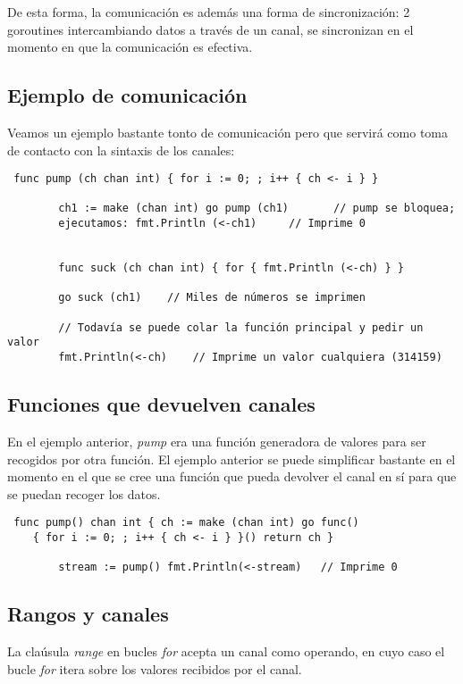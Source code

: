 	De esta forma, la comunicación es además una forma de sincronización:
	2 goroutines intercambiando datos a través de un canal, se sincronizan en el
	momento en que la comunicación es efectiva.
	
	\subsection{Ejemplo de comunicación}
	
	Veamos un ejemplo bastante tonto de comunicación pero que servirá como toma
	de contacto con la sintaxis de los canales:
	
	\begin{verbatim} func pump (ch chan int) { for i := 0; ; i++ { ch <- i } }
	   
		ch1 := make (chan int) go pump (ch1)       // pump se bloquea;
		ejecutamos: fmt.Println (<-ch1)     // Imprime 0
	   
	   
		func suck (ch chan int) { for { fmt.Println (<-ch) } }
	   
		go suck (ch1)    // Miles de números se imprimen
	   
		// Todavía se puede colar la función principal y pedir un valor
		fmt.Println(<-ch)    // Imprime un valor cualquiera (314159)
		\end{verbatim}
	
	\subsection{Funciones que devuelven canales}
	
	En el ejemplo anterior, \textit{pump} era una función generadora de valores
	para ser recogidos por otra función. El ejemplo anterior se puede
	simplificar bastante en el momento en el que se cree una función que pueda
	devolver el canal en sí para que se puedan recoger los datos.
	
	\begin{verbatim} func pump() chan int { ch := make (chan int) go func()
	{ for i := 0; ; i++ { ch <- i } }() return ch }
	   
		stream := pump() fmt.Println(<-stream)   // Imprime 0 \end{verbatim}
	
	\subsection{Rangos y canales}
	
	La claúsula \textit{range} en bucles \textit{for} acepta un canal como
	operando, en cuyo caso el bucle \textit{for} itera sobre los valores
	recibidos por el canal.\\
	
